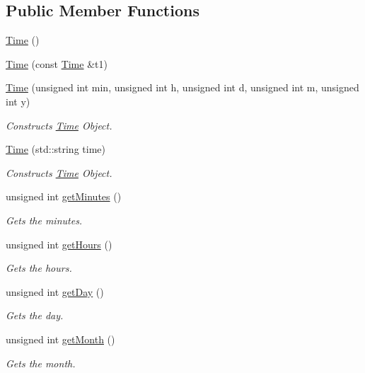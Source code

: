 \subsection*{Public Member Functions}
\begin{DoxyCompactItemize}
\item 
\hyperlink{classTime_a4245e409c7347d1d671858962c2ca3b5}{Time} ()
\item 
\hyperlink{classTime_a49a2959967faff0a8d19ec3cde7436b9}{Time} (const \hyperlink{classTime}{Time} \&t1)
\item 
\hyperlink{classTime_a355bb7292c28e01866289e1119f457a9}{Time} (unsigned int min, unsigned int h, unsigned int d, unsigned int m, unsigned int y)
\begin{DoxyCompactList}\small\item\em Constructs \hyperlink{classTime}{Time} Object. \end{DoxyCompactList}\item 
\hyperlink{classTime_a15f171401599a9a058e89e6cf3244f2b}{Time} (std\+::string time)
\begin{DoxyCompactList}\small\item\em Constructs \hyperlink{classTime}{Time} Object. \end{DoxyCompactList}\item 
unsigned int \hyperlink{classTime_a800d91da444cd295a329925c45942359}{get\+Minutes} ()
\begin{DoxyCompactList}\small\item\em Gets the minutes. \end{DoxyCompactList}\item 
unsigned int \hyperlink{classTime_ac38ba7bbc9876d7d75c6fb16ba7ac453}{get\+Hours} ()
\begin{DoxyCompactList}\small\item\em Gets the hours. \end{DoxyCompactList}\item 
unsigned int \hyperlink{classTime_abdccc37217b520155a67a1d732014f1a}{get\+Day} ()
\begin{DoxyCompactList}\small\item\em Gets the day. \end{DoxyCompactList}\item 
unsigned int \hyperlink{classTime_a22fd86b14d3b067cf1447fd9ca5caf6f}{get\+Month} ()
\begin{DoxyCompactList}\small\item\em Gets the month. \end{DoxyCompactList}\item 

\end{DoxyCompactItemize}
